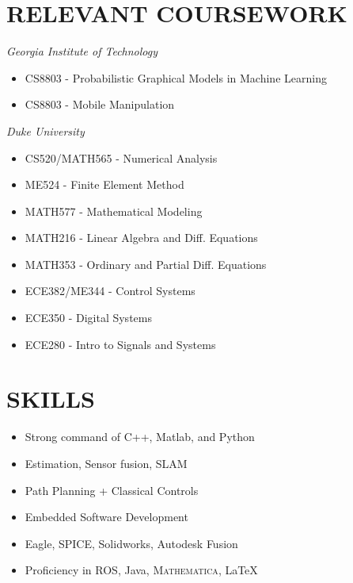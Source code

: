 \documentclass[paper=letter,fontsize=11pt]{scrartcl} %
\newcommand{\NewPart}[2]{\section*{\uppercase{#1} #2}}
\begin{document}
\NewPart{Relevant Coursework}{}
\textit{Georgia Institute of Technology}
	\begin{itemize}
		\item CS8803 - Probabilistic Graphical Models in Machine Learning
		\item CS8803 - Mobile Manipulation
	\end{itemize}
\textit{Duke University}
	\begin{itemize}
		\item CS520/MATH565 - Numerical Analysis
		\item ME524 - Finite Element Method
		\item MATH577 - Mathematical Modeling
		\item MATH216 - Linear Algebra and Diff. Equations
		\item MATH353 - Ordinary and Partial Diff. Equations
		\item ECE382/ME344 - Control Systems
		\item ECE350 - Digital Systems
		\item ECE280 - Intro to Signals and Systems
	\end{itemize}

\NewPart{Skills}{}

\begin{itemize} %
	\item Strong command of C++, Matlab, and Python
	\item Estimation, Sensor fusion, SLAM
	\item Path Planning + Classical Controls
	\item Embedded Software Development
	\item Eagle, SPICE, Solidworks, Autodesk Fusion
	\item Proficiency in ROS, Java, \textsc{Mathematica}, \LaTeX
\end{itemize}
\end{document}
